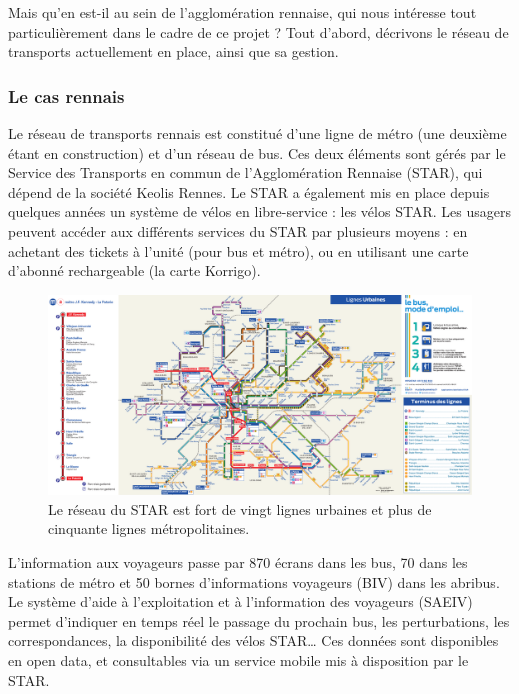             Mais qu'en est-il au sein de l'agglomération rennaise, qui nous intéresse tout particulièrement dans le cadre de ce projet ? Tout d'abord, décrivons le réseau de transports actuellement en place, ainsi que sa gestion.
                
        \subsubsection{Le cas rennais}
            Le réseau de transports rennais est constitué d'une ligne de métro (une deuxième étant en construction) et d'un réseau de bus. Ces deux éléments sont gérés par le Service des Transports en commun de l'Agglomération Rennaise (STAR), qui dépend de la société Keolis Rennes. Le STAR a également mis en place depuis quelques années un système de vélos en libre-service : les vélos STAR. Les usagers peuvent accéder aux différents services du STAR par plusieurs moyens : en achetant des tickets à l'unité (pour bus et métro), ou en utilisant une carte d'abonné rechargeable (la carte Korrigo). 

            \begin{figure}
                \begin{center}
                    \includegraphics[width=1\textwidth]{figure/star_plan.pdf}
                \end{center}
                \caption{Le réseau du STAR est fort de vingt lignes urbaines et plus de cinquante lignes métropolitaines.}
                \label{fig:star_plan}
            \end{figure}
                
            L'information aux voyageurs passe par 870 écrans dans les bus, 70 dans les stations de métro et 50 bornes d’informations voyageurs (BIV) dans les abribus. Le système d’aide à l’exploitation et à l’information des voyageurs (SAEIV) permet d’indiquer en temps réel le passage du prochain bus, les perturbations, les correspondances, la disponibilité des vélos STAR… Ces données sont disponibles en open data, et consultables via un service mobile mis à disposition par le STAR.

